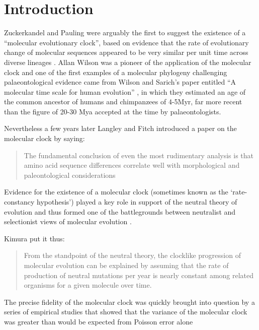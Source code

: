 \section{Introduction} 
Zuckerkandel and Pauling were arguably the first to suggest the existence of a ``molecular evolutionary clock'', based on evidence that the rate of evolutionary change of molecular sequences appeared to be very similar per unit time across diverse lineages \cite{zuckerkandl1965}. Allan Wilson was a pioneer of the application of the molecular clock and one of the first examples of a molecular phylogeny challenging palaeontological evidence came from Wilson and Sarich's paper entitled ``A molecular time scale for human evolution'' \cite{WilsonSarich1969}, in which they estimated an age of the common ancestor of humans and chimpanzees of 4-5Myr, far more recent than the figure of 20-30 Mya accepted at the time by palaeontologists.

Nevertheless a few years later Langley and Fitch introduced a paper on the molecular clock by saying:

\begin{quotation}
The fundamental conclusion of even the most rudimentary analysis is that amino acid sequence differences correlate well with morphological and paleontological considerations
\end{quotation}

Evidence for the existence of a molecular clock (sometimes known as the `rate-constancy hypothesis') played a key role in support of the neutral theory of evolution and thus formed one of the battlegrounds between neutralist and selectionist views of molecular evolution \cite{Kimura1987}.

Kimura \cite{Kimura1987} put it thus:

\begin{quotation}
From the standpoint of the neutral theory, the clocklike progression of molecular evolution can be explained by assuming that the rate of production of neutral mutations per year is nearly constant among related organisms for a given molecule over time. 
\end{quotation}
 
The precise fidelity of the molecular clock was quickly brought into question by a series of empirical studies that showed that the variance of the molecular clock was greater than would be expected from Poisson error alone \cite{}  

  
  
  
  
  
  
  
  
  
  
  
  
  
  
  
  